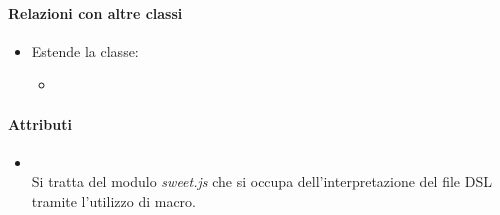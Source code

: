 \paragraph*{Relazioni con altre classi}
\begin{itemize}
\item[] Estende la classe:
\begin{itemize}
\item {}
\end{itemize}


\end{itemize}

\paragraph*{Attributi}
\begin{itemize}
\item[]  \\ Si tratta del modulo \textit{sweet.js} che si occupa dell'interpretazione del file DSL tramite l'utilizzo di macro.
\end{itemize}

